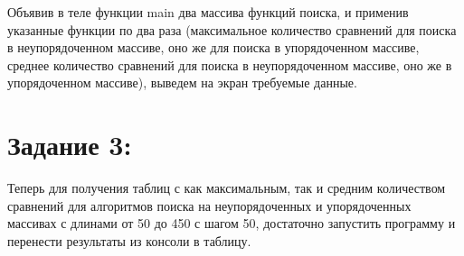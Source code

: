 \documentclass[12pt]{article}
\begin{document}
{	Объявив в теле функции main два массива функций поиска, и применив указанные функции по два раза (максимальное количество сравнений для поиска в неупорядоченном массиве, оно же для поиска в упорядоченном массиве, среднее количество сравнений для поиска в неупорядоченном массиве, оно же в упорядоченном массиве), выведем на экран требуемые данные.
	
	 
	
	\section{Задание 3:}
	\label{task_3}
	
	Теперь для получения таблиц с как максимальным, так и средним количеством сравнений для алгоритмов поиска на неупорядоченных и упорядоченных массивах с длинами от 50 до 450 с шагом 50, достаточно запустить программу и перенести результаты из консоли в таблицу.
	
	\begin{figure}[h]
		\noindent{}
	\end{figure}
	\begin{figure}[h]
		\noindent{}
	\end{figure}
	
}
\end{document}
